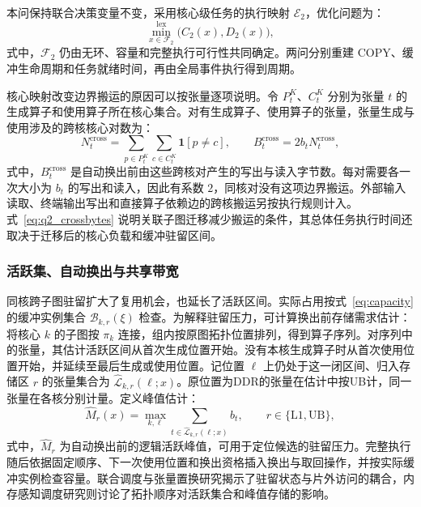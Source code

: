 本问保持联合决策变量不变，采用核心级任务的执行映射 $\mathcal E_2$，优化问题为：
\begin{equation}
 \min_{x\in\mathcal F_2}^{\mathrm{lex}}\bigl(C_2(x),D_2(x)\bigr),
 \label{eq:q2_problem}
\end{equation}
\noindent 式中，$\mathcal F_2$ 仍由无环、容量和完整执行可行性共同确定。两问分别重建 COPY、缓冲生命周期和任务就绪时间，再由全局事件执行得到周期。

核心映射改变边界搬运的原因可以按张量逐项说明。令 $P_t^K$、$C_t^K$ 分别为张量 $t$ 的生成算子和使用算子所在核心集合。对有生成算子、使用算子的张量，张量生成与使用涉及的跨核核心对数为：
\begin{equation}
 N_t^{\mathrm{cross}}=\sum_{p\in P_t^K}\sum_{c\in C_t^K}\mathbf1[p\ne c],
 \qquad B_t^{\mathrm{cross}}=2b_tN_t^{\mathrm{cross}},
 \label{eq:q2_crossbytes}
\end{equation}
\noindent 式中，$B_t^{\mathrm{cross}}$ 是自动换出前由这些跨核对产生的写出与读入字节数。每对需要各一次大小为 $b_t$ 的写出和读入，因此有系数 $2$，同核对没有这项边界搬运。外部输入读取、终端输出写出和直接算子依赖边的跨核搬运另按执行规则计入。式~\eqref{eq:q2_crossbytes} 说明关联子图迁移减少搬运的条件，其总体任务执行时间还取决于迁移后的核心负载和缓冲驻留区间。

\subsubsection{活跃集、自动换出与共享带宽}
同核跨子图驻留扩大了复用机会，也延长了活跃区间。实际占用按式~\eqref{eq:capacity} 的缓冲实例集合 $\mathcal B_{k,r}(\xi)$ 检查。为解释驻留压力，可计算换出前存储需求估计：将核心 $k$ 的子图按 $\pi_k$ 连接，组内按原图拓扑位置排列，得到算子序列。对序列中的张量，其估计活跃区间从首次生成位置开始。没有本核生成算子时从首次使用位置开始，并延续至最后生成或使用位置。记位置 $\ell$ 上仍处于这一闭区间、归入存储区 $r$ 的张量集合为 $\widehat{\mathcal L}_{k,r}(\ell;x)$。原位置为DDR的张量在估计中按UB计，同一张量在各核分别计量。定义峰值估计：
\begin{equation}
 \widehat M_r(x)=\max_{k,\ell}\sum_{t\in\widehat{\mathcal L}_{k,r}(\ell;x)}b_t,
 \qquad r\in\{\mathrm{L1},\mathrm{UB}\},
 \label{eq:q2_livepeak}
\end{equation}
\noindent 式中，$\widehat M_r$ 为自动换出前的逻辑活跃峰值，可用于定位候选的驻留压力。完整执行随后依据固定顺序、下一次使用位置和换出资格插入换出与取回操作，并按实际缓冲实例检查容量。联合调度与张量置换研究揭示了驻留状态与片外访问的耦合\cite{A16}，内存感知调度研究则讨论了拓扑顺序对活跃集合和峰值存储的影响\cite{A17}。

